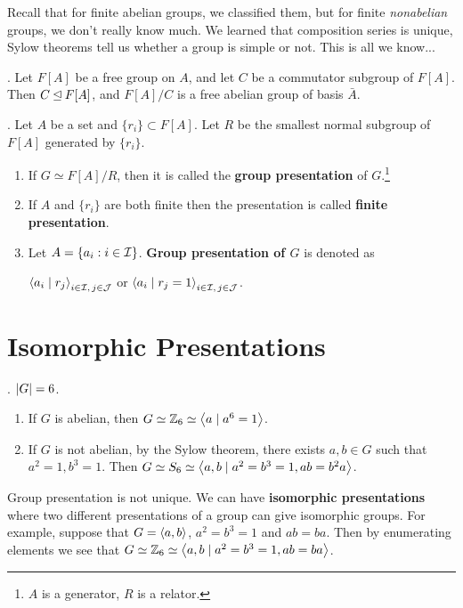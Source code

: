 
Recall that for finite abelian groups, we classified them, but for finite \textit{nonabelian} groups, we don't really know much. We learned that composition series is unique, Sylow theorems tell us whether a group is simple or not. This is all we know...

\ex. Let \(F[A]\) be a free group on \(A\), and let \(C\) be a commutator subgroup of \(F[A]\). Then \(C \unlhd F[A]\), and \(F[A]/C\) is a free abelian group of basis \(\bar{A}\).

. Let \(A\) be a set and \(\{r_i\} \subset F[A]\). Let \(R\) be the smallest normal subgroup of \(F[A]\) generated by \(\{r_i\}\).
\begin{enumerate}
    \item If \(G \simeq F[A]/R\), then it is called the \textbf{group presentation} of \(G\).\footnote{\(A\) is a generator, \(R\) is a relator.}
    \item If \(A\) and \(\{r_i\}\) are both finite then the presentation is called \textbf{finite presentation}.
    \item Let \(A = \{a_i : i \in \mathcal{I}\}\). \textbf{Group presentation of \(G\)} is denoted as
          \begin{center}
              \(\left\langle a_i \mid r_j \right\rangle_{i \in \mathcal{I},\, j \in \mathcal{J}}\) \quad or \quad \(\left\langle a_i \mid r_j = 1 \right\rangle_{i \in \mathcal{I},\, j \in \mathcal{J}}\).
          \end{center}
\end{enumerate}

\section*{Isomorphic Presentations}

\ex. \(\left| G \right| = 6\).
\begin{enumerate}
    \item If \(G\) is abelian, then \(G \simeq \mathbb{Z}_6 \simeq \left\langle a \mid a^6 = 1 \right\rangle\).
    \item If \(G\) is not abelian, by the Sylow theorem, there exists \(a, b \in G\) such that \(a^2 = 1, b^3 = 1\). Then \(G \simeq S_6 \simeq \left\langle a, b \mid a^2 = b^3 = 1, ab = b^2a \right\rangle\).
\end{enumerate}

\rmk Group presentation is not unique. We can have \textbf{isomorphic presentations} where two different presentations of a group can give isomorphic groups. For example, suppose that \(G = \left\langle a, b \right\rangle\), \(a^2 = b^3 = 1\) and \(ab = ba\). Then by enumerating elements we see that \(G \simeq \mathbb{Z}_6 \simeq \left\langle a, b \mid a^2 = b^3 = 1, ab = ba \right\rangle\).

